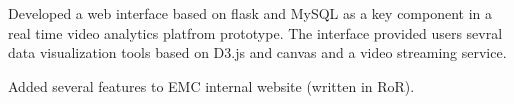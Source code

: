 \begin{cventry}
  \item Developed a web interface based on flask and MySQL as a key component in a real time video analytics platfrom prototype.
  The interface provided users sevral data visualization tools based on D3.js and canvas and a video streaming service.
  \item Added several features to EMC internal website (written in RoR).
\end{cventry}
